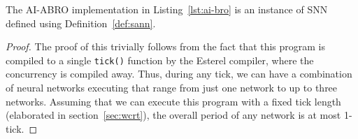 


\begin{prop}
	\label{lemma1}
	The AI-ABRO implementation in Listing~\ref{lst:ai-bro} is an instance of \ac{SNN} defined using Definition~\ref{def:sann}.
\end{prop}

\begin{proof}
	The proof of this trivially follows from the fact that this program is compiled to a single \texttt{tick()} function by the 
	Esterel compiler, where the concurrency is compiled away. Thus, during any tick, we can have a combination of neural networks 
	executing that range from just one network to up to three networks. Assuming that we can execute this program with a fixed tick length 
	(elaborated in section~\ref{sec:wcrt}), the overall period of any network is at most 1-tick. 
\end{proof}
